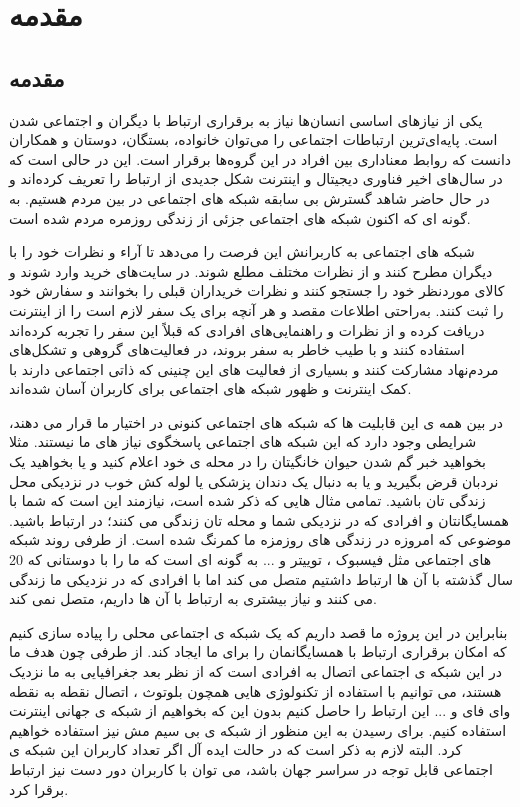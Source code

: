 
\chapter{مقدمه}
\thispagestyle{empty}
\section{مقدمه}
یکی از نیازهای اساسی انسان‌ها نیاز به برقراری ارتباط با دیگران و اجتماعی شدن است. پایه‌ای‌ترین ارتباطات اجتماعی را می‌توان خانواده، بستگان، دوستان و همکاران دانست که روابط معناداری بین افراد در این گروه‌ها برقرار است. این در حالی است که در سال‌های اخیر فناوری دیجیتال و اینترنت شکل جدیدی از ارتباط را تعریف کرده‌اند و در حال حاضر شاهد گسترش بی سابقه شبکه های اجتماعی
 در بین مردم هستیم. به گونه ای که اکنون شبکه های اجتماعی جزئی از زندگی روزمره مردم شده است. 
 
 شبکه های اجتماعی به کاربرانش این فرصت را می‌دهد تا آراء و نظرات خود را با دیگران مطرح کنند و از نظرات مختلف مطلع شوند. در سایت‌های خرید وارد شوند و کالای موردنظر خود را جستجو کنند و نظرات خریداران قبلی را بخوانند و سفارش خود را ثبت کنند. به‌راحتی اطلاعات مقصد و هر آنچه برای یک سفر لازم است را از اینترنت دریافت کرده و از نظرات و راهنمایی‌های افرادی که قبلاً این سفر را تجربه کرده‌اند استفاده کنند و با طیب خاطر به سفر بروند، در فعالیت‌های گروهی و تشکل‌های مردم‌نهاد مشارکت کنند و بسیاری از فعالیت های این چنینی که ذاتی اجتماعی دارند با کمک اینترنت و ظهور شبکه های اجتماعی برای کاربران آسان شده‌اند.
 
در بین همه ی این قابلیت ها که شبکه های اجتماعی کنونی در اختیار ما قرار می دهند، شرایطی وجود دارد که این شبکه های اجتماعی پاسخگوی نیاز های ما نیستند. مثلا بخواهید خبر گم شدن حیوان خانگیتان را در محله ی خود اعلام کنید و یا بخواهید یک نردبان قرض بگیرید و یا به دنبال یک دندان پزشکی یا لوله کش خوب در نزدیکی  محل زندگی تان باشید. تمامی مثال هایی که ذکر شده است، نیازمند این است که شما با همسایگانتان و افرادی که در نزدیکی شما و محله تان زندگی می کنند؛ در ارتباط باشید. موضوعی که امروزه در زندگی های روزمزه ما کمرنگ شده است. از طرفی روند شبکه های اجتماعی مثل فیسبوک
، توییتر 
و ... به گونه ای است که ما را با دوستانی که 20 سال گذشته با آن ها ارتباط داشتیم متصل می کند اما با افرادی که در نزدیکی ما زندگی می کنند و نیاز بیشتری به ارتباط با آن ها داریم، متصل نمی کند.

بنابراین در این پروژه ما قصد داریم که یک شبکه ی اجتماعی محلی را پیاده سازی کنیم که امکان برقراری ارتباط با همسایگانمان را برای ما ایجاد کند. از طرفی چون هدف ما در این شبکه ی اجتماعی اتصال به افرادی است که از نظر بعد جغرافیایی به ما نزدیک هستند، می توانیم با استفاده از تکنولوژی هایی همچون بلوتوث
، اتصال نقطه به نقطه وای فای 
و ... این ارتباط را حاصل کنیم بدون این که بخواهیم از شبکه ی جهانی اینترنت
 استفاده کنیم. برای رسیدن به این منظور از شبکه ی بی سیم مش 
 نیز استفاده خواهیم کرد. البته لازم به ذکر است که در حالت ایده آل اگر تعداد کاربران این شبکه ی اجتماعی قابل توجه در سراسر جهان باشد، می توان با کاربران دور دست نیز ارتباط برقرا کرد. 

